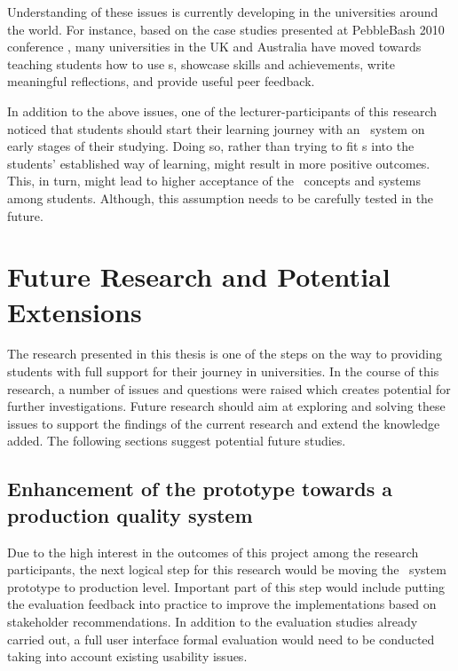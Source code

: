Understanding of these issues is currently developing in the universities
around the world. For instance, based on the case studies presented at
PebbleBash 2010 conference \citep{PebbleLearningLtd2010a}, many universities in
the UK and Australia have moved towards teaching students how to use \ep s,
showcase skills and achievements, write meaningful reflections, and provide
useful peer feedback.

In addition to the above issues, one of the lecturer-participants of this
research noticed that students should start their learning journey with an
\ep~system on early stages of their studying. Doing so, rather than trying to
fit \ep s into the students' established way of learning, might result in more
positive outcomes. This, in turn, might lead to higher acceptance of the
\ep~concepts and systems among students. Although, this assumption needs to
be carefully tested in the future.

\section{Future Research and Potential Extensions}
The research presented in this thesis is one of the steps on the way to
providing students with full support for their \LLLs journey in universities. In
the course of this research, a number of issues and questions were raised which
creates potential for further investigations. Future research should aim at
exploring and solving these issues to support the findings of the current
research and extend the knowledge added. The following sections suggest
potential future studies.

\subsection[Enhancement of the prototype]{Enhancement of the prototype towards a
production quality system} 
Due to the high interest in the outcomes of this project among the research
participants, the next logical step for this research would be moving the
\ep~system prototype to production level. Important part of this step would
include putting the evaluation feedback into practice to improve the
implementations based on stakeholder recommendations. In addition to the
evaluation studies already carried out, a full user interface formal evaluation
would need to be conducted taking into account existing usability issues.

